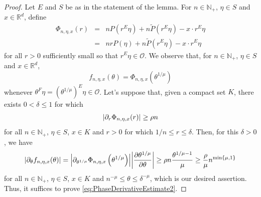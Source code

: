\documentclass[11pt]{article}
\newcommand{\p}{\partial}
\newcommand{\f}[2]{\frac{#1}{#2}}
\begin{document}
\begin{proof}
Let $E$ and $S$ be as in the statement of the lemma. For $n\in\mathbb{N}_+$, $\eta\in S$ and $x\in \mathbb{R}^d$, define
\begin{eqnarray*}
\Phi_{n,\eta,x}(r)&=&nP(r^E\eta)+n\widetilde{P}(r^E\eta)-x\cdot r^E\eta\\
&=&nrP(\eta)+n\widetilde{P}(r^E\eta)-x\cdot r^E\eta
\end{eqnarray*}
for all $r>0$ sufficiently small so that $r^E\eta\in \mathcal{O}$.  We observe that, for $n\in\mathbb{N}_+$, $\eta\in S$ and $x\in\mathbb{R}^d$, 
\begin{equation*}
f_{n,\eta,x}(\theta)=\Phi_{n,\eta,x}\left(\theta^{1/\mu}\right)
\end{equation*}
whenever $\theta^F\eta=(\theta^{1/\mu})^E\eta\in \mathcal{O}$. Let's suppose that, given a compact set $K$, there exists $0<\delta\leq 1$ for which
\begin{equation}\label{eq:PhaseDerivativeEstimate2}
\abs{\partial_r \Phi_{n,\eta,x}(r)}\geq\rho n
\end{equation}
for all $n\in\mathbb{N}_+$, $\eta\in S$, $x\in K$ and $r>0$ for which $1/n\leq r\leq \delta$. Then, for this $\delta>0$, we have
\begin{equation*}
    \abs{\p_\theta f_{n,\eta,x} (\theta)} = 
     \abs{  \p_{\theta^{1/\mu}} \Phi_{n,\eta,x}\left(\theta^{1/\mu}\right)}
     \abs{ \f{\p \theta^{1/\mu}}{\p \theta}} 
     \geq 
    \rho n\f{\theta^{1/\mu - 1}  }{\mu}  \geq \f{\rho}{\mu}n^{\min\{\mu,1 \}}
\end{equation*}
for all $n\in\mathbb{N}_+$, $\eta\in S$, $x\in K$ and $n^{-\mu}\leq \theta\leq \delta^{-\mu}$, which is our desired assertion. Thus, it suffices to prove \eqref{eq:PhaseDerivativeEstimate2}.



\end{proof}
\end{document}
